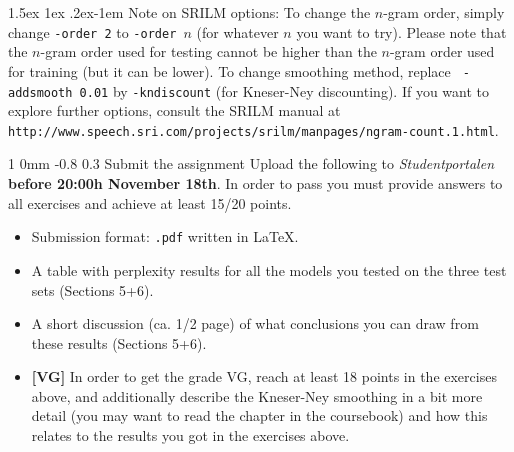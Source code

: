 \documentclass[11pt]{article}
\makeatletter
\newcommand{\newsec}[2]{\section{#1}\label{sec:#2}\noindent}
\renewcommand{\section}{\@startsection
{section}%
{1}%
{0mm}%
{-0.8\baselineskip}%
{0.3\baselineskip}%
{\bfseries\large}}%
\renewcommand{\paragraph}{%
  \@startsection{paragraph}{4}%
  {\z@}{1.5ex \@plus 1ex \@minus .2ex}{-1em}%
  {\normalfont\normalsize\bfseries}%
}\makeatother
\makeatother
\begin{document}
\paragraph{Note on SRILM options:} To change the $n$-gram order,
simply change {\tt -order\,2} to {\tt -order\,$n$} (for whatever $n$
you want to try).  Please note that the $n$-gram order used for
testing cannot be higher than the $n$-gram order used for training
(but it can be lower). To change smoothing method, replace {\tt
  -addsmooth\,0.01} by {\tt -kndiscount} (for Kneser-Ney
discounting). If you want to explore further options, consult the
SRILM manual at {\small {\tt
    http://www.speech.sri.com/projects/srilm/manpages/ngram-count.1.html}}.

\newsec{Submit the assignment}{submit}%
Upload the following to {\it Studentportalen}
\textbf{before 20:00h November 18th}. In order to pass you must
provide answers to all exercises and achieve at least 15/20 points.

\begin{itemize}[noitemsep,topsep=0.2cm]
\item Submission format: \texttt{.pdf} written in \LaTeX.
\item A table with perplexity results for all the models you tested on
  the three test sets (Sections 5+6).
\item A short discussion (ca. 1/2 page) of what conclusions you can
  draw from these results (Sections 5+6).
\item \textbf{[VG]} In order to get the grade VG, reach at least 18
  points in the exercises above, and additionally describe the
  Kneser-Ney smoothing in a bit more detail (you may want to read the
  chapter in the coursebook) and how this relates to the results you
  got in the exercises above.

\end{itemize}
\end{document}
